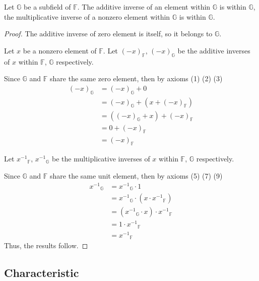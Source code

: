 \begin{theorem}
	Let $\mathbb{G}$ be a subfield of $\mathbb{F}$. The additive inverse of an element within $\mathbb{G}$ is within $\mathbb{G}$, the multiplicative inverse of a nonzero element within $\mathbb{G}$ is within $\mathbb{G}$.
\end{theorem}

\begin{proof}
	The additive inverse of zero element is itself, so it belongs to $\mathbb{G}$.

	Let $x$ be a nonzero element of $\mathbb{F}$. Let ${(-x)}_{\mathbb{F}}$, ${(-x)}_{\mathbb{G}}$ be the additive inverses of $x$ within $\mathbb{F}$, $\mathbb{G}$ respectively.

	Since $\mathbb{G}$ and $\mathbb{F}$ share the same zero element, then by axioms (1) (2) (3)
	\begin{align*}
		{(-x)}_{\mathbb{G}} & = {(-x)}_{\mathbb{G}} + 0                         \\
		                    & = {(-x)}_{\mathbb{G}} + (x + {(-x)}_{\mathbb{F}}) \\
		                    & = ({(-x)}_{\mathbb{G}} + x) + {(-x)}_{\mathbb{F}} \\
		                    & = 0 + {(-x)}_{\mathbb{F}}                         \\
		                    & = {(-x)}_{\mathbb{F}}
	\end{align*}

	Let ${x^{-1}}_{\mathbb{F}}$, ${x^{-1}}_{\mathbb{G}}$ be the multiplicative inverses of $x$ within $\mathbb{F}$, $\mathbb{G}$ respectively.

	Since $\mathbb{G}$ and $\mathbb{F}$ share the same unit element, then by axioms (5) (7) (9)
	\begin{align*}
		{x^{-1}}_{\mathbb{G}} & = {x^{-1}}_{\mathbb{G}}\cdot 1                              \\
		                      & = {x^{-1}}_{\mathbb{G}}\cdot (x\cdot {x^{-1}}_{\mathbb{F}}) \\
		                      & = ({x^{-1}}_{\mathbb{G}}\cdot x)\cdot {x^{-1}}_{\mathbb{F}} \\
		                      & = 1\cdot {x^{-1}}_{\mathbb{F}}                              \\
		                      & = {x^{-1}}_{\mathbb{F}}
	\end{align*}
	Thus, the results follow.
\end{proof}

\subsection{Characteristic}

